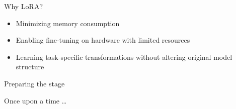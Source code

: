 \documentclass[aspectratio=169]{beamer}
\begin{document}
\note{ }

\begin{frame}{Why LoRA?}

  \begin{itemize}
    \setlength\itemsep{1em}
    \item Minimizing memory consumption
    \item Enabling fine-tuning on hardware with limited resources
    \item Learning task-specific transformations without altering original model structure
  \end{itemize}

\end{frame}

\note{ }


\begin{frame}{Preparing the stage}

  \begin{center}
    \Huge \color[rgb]{1,1,1}Once upon a time \dots
  \end{center}

\end{frame}
\end{document}
